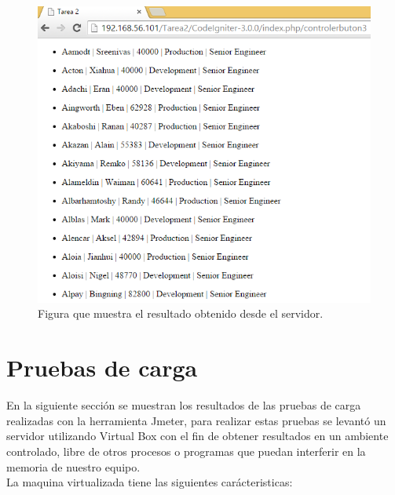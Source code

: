\begin{figure}[htb]
	\label{Figura7}
	\begin{center}
		\includegraphics[scale=0.7]{imagenes/resultado3.png}
		\caption{Figura que muestra el resultado obtenido desde el servidor.}
	\end{center}
\end{figure}

\newpage

\section{Pruebas de carga}

 En la siguiente sección se muestran los resultados de las pruebas de carga realizadas con la herramienta Jmeter, para realizar estas pruebas se levantó un servidor utilizando Virtual Box con el fin de obtener resultados en un ambiente controlado, libre de otros procesos o programas que puedan interferir en la memoria de nuestro equipo. \cite{jmeter} \\
 
 La maquina virtualizada tiene las siguientes carácteristicas:
 
